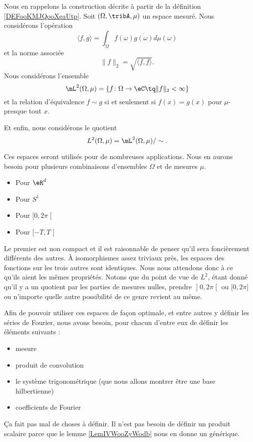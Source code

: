 \begin{normaltext}  \label{NORMooUEIEooYtlFse}
    Nous en rappelons la construction décrite à partir de la définition \ref{DEFooKMJQooXeaUtp}. Soit \( (\Omega,\tribA,\mu)\) un espace mesuré. Nous considérons l'opération
    \begin{equation}    \label{DefProdScalLubrgTj}
        \langle f, g\rangle =\int_{\Omega}f(\omega)\overline{ g(\omega)}d\mu(\omega)
    \end{equation}
    et la norme associée
    \begin{equation}
        \| f \|_2=\sqrt{\langle f, f\rangle }.
    \end{equation}
    Nous considérons l'ensemble
    \begin{equation}
        \mL^2(\Omega,\mu)=\{ f\colon \Omega\to \eC\tq \| f \|_2<\infty \}
    \end{equation}
    et la relation d'équivalence \( f\sim g\) si et seulement si \( f(x)=g(x)\) pour \( \mu\)-presque tout \( x\).

    Et enfin, nous considérons le quotient
    \begin{equation}
        L^2(\Omega,\mu)=\mL^2(\Omega,\mu)/\sim.
    \end{equation}
\end{normaltext}

Ces espaces seront utilisés pour de nombreuses applications. Nous en aurons besoin pour plusieurs combinaisons d'ensembles \( \Omega\) et de mesures \( \mu\).
\begin{itemize}
    \item Pour \( \eR^d\)
    \item Pour \( S^1\)
    \item Pour \( \mathopen[ 0 , 2\pi \mathclose[\)
        \item Pour \( \mathopen[ -T , T \mathclose[\)
\end{itemize}
Le premier est non compact et il est raisonnable de penser qu'il sera foncièrement différents des autres. À isomorphismes assez triviaux près, les espaces des fonctions sur les trois autres sont identiques. Nous nous attendons donc à ce qu'ils aient les mêmes propriétés. Notons que du point de vue de \( L^2\), étant donné qu'il y a un quotient par les parties de mesures nulles, prendre \( \mathopen] 0 , 2\pi \mathclose[\) ou \( \mathopen[ 0 , 2\pi \mathclose]\) ou n'importe quelle autre possibilité de ce genre revient au même.

Afin de pouvoir utiliser ces espaces de façon optimale, et entre autres y définir les séries de Fourier, nous avons besoin, pour chacun d'entre eux de définir les éléments suivants :
\begin{itemize}
    \item mesure
    \item produit de convolution
    \item le système trigonométrique (que nous allons montrer être une base hilbertienne)
    \item coefficients de Fourier
\end{itemize}
Ça fait pas mal de choses à définir. Il n'est pas besoin de définir un produit scalaire parce que le lemme \ref{LemIVWooZyWodb} nous en donne un générique.

